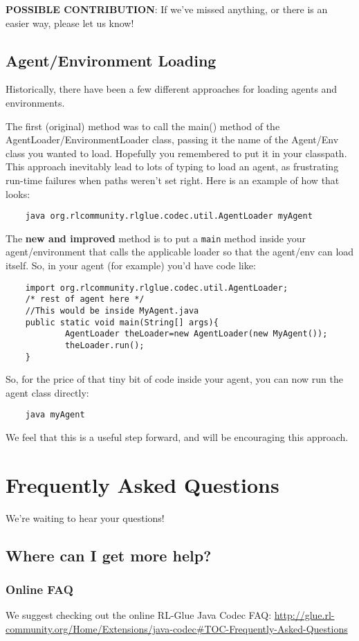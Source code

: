 \documentclass[11pt]{article}
\begin{document}
\textbf{POSSIBLE CONTRIBUTION}: If we've missed anything, or there is an easier way, please let us know!

\subsection{Agent/Environment Loading}
Historically, there have been a few different approaches for loading agents and environments.

The first (original) method was to call the main() method of the AgentLoader/EnvironmentLoader class, passing it the name of the 
Agent/Env class you wanted to load.  Hopefully you remembered to put it in your classpath.  This approach inevitably lead to lots of typing to load an agent, as frustrating run-time failures when paths weren't set right.
Here is an example of how that looks:
\begin{verbatim}
	java org.rlcommunity.rlglue.codec.util.AgentLoader myAgent
\end{verbatim}

The \textbf{new and improved} method is to put a \texttt{main} method inside your agent/environment that calls the applicable loader so that the agent/env can load itself.  So, in your agent (for example) you'd have code like:
\begin{verbatim}
	import org.rlcommunity.rlglue.codec.util.AgentLoader;
	/* rest of agent here */
	//This would be inside MyAgent.java
	public static void main(String[] args){
	        AgentLoader theLoader=new AgentLoader(new MyAgent());
	        theLoader.run();
	}
\end{verbatim}

So, for the price of that tiny bit of code inside your agent, you can now run the agent class directly:
\begin{verbatim}
	java myAgent
\end{verbatim}

We feel that this is a useful step forward, and will be encouraging this approach.

\section{Frequently Asked Questions}
We're waiting to hear your questions!

\subsection{Where can I get more help?}
\subsubsection{Online FAQ}
We suggest checking out the online RL-Glue Java Codec FAQ:\newline
\url{http://glue.rl-community.org/Home/Extensions/java-codec#TOC-Frequently-Asked-Questions}
\end{document}
